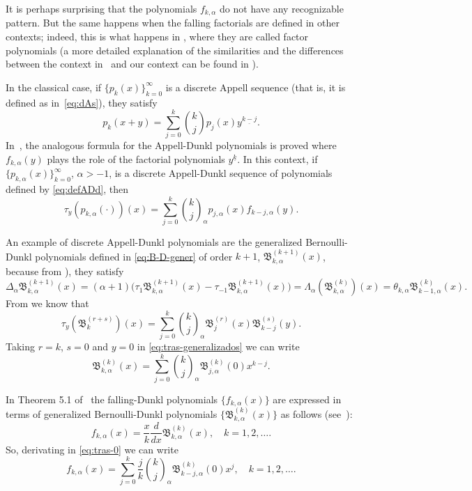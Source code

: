 \documentclass[11pt,a4paper]{article}
\theoremstyle{plain}
\theoremstyle{remark}
\newcommand{\La}{\Lambda_{\alpha}}
\newcommand{\binoma}[2]{\binom{#1}{#2}_{\!\alpha}}
\newcommand{\B}{\mathfrak{B}}
\begin{document}
It is perhaps surprising that the polynomials $f_{k,\alpha}$ do not have any 
recognizable pattern.
But the same happens when the falling factorials are defined in other contexts;
indeed, this is what happens in \cite[\S\,18]{Cho},
where they are called factor polynomials
(a more detailed explanation of the similarities and the differences
between the context in~\cite{Cho} and our context can be found 
in \cite[Remark~1]{CMV}).



In the classical case, if $\{p_k(x)\}_{k=0}^{\infty}$ is a discrete Appell
sequence (that is, it is defined as in~\eqref{eq:dAs}), they satisfy
\begin{equation*}
  p_k(x+y) = \sum_{j=0}^k \binom{k}{j} p_j(x)y^{\underline{k-j}}.
\end{equation*}
In~\cite{ELMV}, the analogous formula for the Appell-Dunkl polynomials is proved where $f_{k,\alpha}(y)$ plays the role of the factorial polynomials $y^{\underline{k}}$. In this context, if $\{p_{k,\alpha}(x)\}_{k=0}^{\infty}$, $\alpha>-1$, is a discrete Appell-Dunkl sequence of polynomials defined by \eqref{eq:defADd}, then
\[
  \tau_y(p_{k,\alpha}(\cdot))(x)
  = \sum_{j=0}^k \binoma{k}{j} p_{j,\alpha}(x) f_{k-j,\alpha}(y).
\]

An example of discrete Appell-Dunkl polynomials are the generalized Bernoulli-Dunkl polynomials defined in \eqref{eq:B-D-gener} of order $k+1$, $\B_{k,\alpha}^{(k+1)}(x)$, because from \cite[Theorem 8.2]{CMV}), they satisfy
\begin{equation*}
  \Delta_{\alpha} \B_{k,\alpha}^{(k+1)}(x) 
  = (\alpha+1)\big(\tau_1 \B_{k,\alpha}^{(k+1)}(x) - \tau_{-1} \B_{k,\alpha}^{(k+1)}(x)\big)
  = \La(\B_{k,\alpha}^{(k)})(x) = \theta_{k,\alpha} \B_{k-1,\alpha}^{(k)}(x).
\end{equation*}
From \cite[Theorem 8.3]{CMV} we know that 
\begin{equation}
\label{eq:tras-generalizados}
  \tau_y(\B_k^{(r+s)})(x)=\sum_{j=0}^{k}\binoma{k}{j}\B_j^{(r)}(x)\B_{k-j}^{(s)}(y).
\end{equation}
Taking $r=k$, $s=0$ and $y=0$ in \eqref{eq:tras-generalizados} we can write
\begin{equation}
\label{eq:tras-0}
  \B_{k,\alpha}^{(k)}(x) = \sum_{j=0}^k \binoma{k}{j}\B_{j,\alpha}^{(k)}(0)x^{k-j}.
\end{equation}

In Theorem 5.1 of~\cite{ELMV} the falling-Dunkl polynomials $\{f_{k,\alpha}(x)\}$ are expressed in terms of generalized Bernoulli-Dunkl polynomials $\{\B_{k,\alpha}^{(k)}(x)\}$ as follows (see~\cite{ELMV}):
\begin{equation*}
  f_{k,\alpha}(x) = \frac{x}{k} \frac{d}{dx}\B_{k,\alpha}^{(k)}(x),
  \quad k = 1,2,\ldots.
\end{equation*}
So, derivating in \eqref{eq:tras-0} we can write
\begin{equation}
\label{eq:relation}
  f_{k,\alpha}(x) =\sum_{j=0}^k \frac{j}{k}\binoma{k}{j} \B_{k-j,\alpha}^{(k)}(0)x^j,
  \quad k = 1,2,\ldots.
\end{equation}
\end{document}
